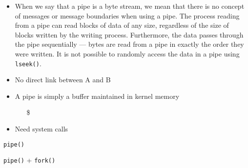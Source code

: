 \begin{itemize}
\item When we say that a pipe is a byte stream, we mean that there is no concept of
  messages or message boundaries when using a pipe. The process reading from a pipe can
  read blocks of data of any size, regardless of the size of blocks written by the writing
  process. Furthermore, the data passes through the pipe sequentially --- bytes are read from
  a pipe in exactly the order they were written. It is not possible to randomly access the
  data in a pipe using \texttt{lseek()}. 
\end{itemize}


\begin{frame}
\begin{center}
\end{center}
\begin{itemize}
\item No direct link between A and B
\item A pipe is simply a buffer maintained in kernel memory
  \begin{itemize}
  \item[\$] 
  \end{itemize}
\item Need system calls
\end{itemize}
\end{frame}

\begin{frame}{\texttt{pipe()}}
  \begin{center}
    \begin{minipage}{.35\linewidth}
    \end{minipage}\quad
    \begin{minipage}{.35\linewidth}
    \end{minipage}
  \end{center}
  \begin{description}
  \item[\texttt{pipe()} + \texttt{fork()}]
  \end{description}
  \begin{center}
  \end{center}
\end{frame}

